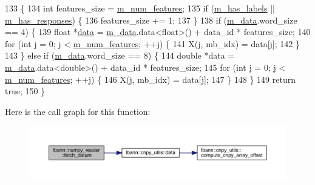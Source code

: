 \begin{DoxyCode}
133                                                                        \{
134   \textcolor{keywordtype}{int} features\_size = \hyperlink{classlbann_1_1numpy__reader_aef25f95077f565fa9616ec353b93f675}{m\_num\_features};
135   \textcolor{keywordflow}{if} (\hyperlink{classlbann_1_1numpy__reader_a0e8caa5609e706bf909b78c4c35377b8}{m\_has\_labels} || \hyperlink{classlbann_1_1numpy__reader_a7567338be86dff81afece19d031a942d}{m\_has\_responses}) \{
136     features\_size += 1;
137   \}
138   \textcolor{keywordflow}{if} (\hyperlink{classlbann_1_1numpy__reader_a6d43a1eae0fedb6fa237b24cef8f37fa}{m\_data}.word\_size == 4) \{
139     \textcolor{keywordtype}{float} *\hyperlink{namespacelbann_1_1cnpy__utils_a9ac86d96ccb1f8b4b2ea16441738781f}{data} = \hyperlink{classlbann_1_1numpy__reader_a6d43a1eae0fedb6fa237b24cef8f37fa}{m\_data}.data<\textcolor{keywordtype}{float}>() + data\_id * features\_size;
140     \textcolor{keywordflow}{for} (\textcolor{keywordtype}{int} j = 0; j < \hyperlink{classlbann_1_1numpy__reader_aef25f95077f565fa9616ec353b93f675}{m\_num\_features}; ++j) \{
141       X(j, mb\_idx) = data[j];
142     \}
143   \} \textcolor{keywordflow}{else} \textcolor{keywordflow}{if} (\hyperlink{classlbann_1_1numpy__reader_a6d43a1eae0fedb6fa237b24cef8f37fa}{m\_data}.word\_size == 8) \{
144     \textcolor{keywordtype}{double} *data = \hyperlink{classlbann_1_1numpy__reader_a6d43a1eae0fedb6fa237b24cef8f37fa}{m\_data}.data<\textcolor{keywordtype}{double}>() + data\_id * features\_size;
145     \textcolor{keywordflow}{for} (\textcolor{keywordtype}{int} j = 0; j < \hyperlink{classlbann_1_1numpy__reader_aef25f95077f565fa9616ec353b93f675}{m\_num\_features}; ++j) \{
146       X(j, mb\_idx) = data[j];
147     \}
148   \}
149   \textcolor{keywordflow}{return} \textcolor{keyword}{true};
150 \}
\end{DoxyCode}
Here is the call graph for this function\+:\nopagebreak
\begin{figure}[H]
\begin{center}
\leavevmode
\includegraphics[width=350pt]{classlbann_1_1numpy__reader_ab08dc207eaae7c7f5a70e602da3c1be0_cgraph}
\end{center}
\end{figure}
